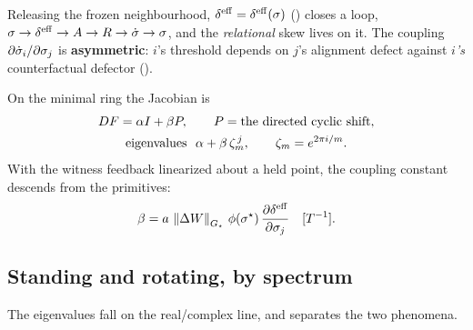 \documentclass[../main]{subfiles}
\begin{document}
Releasing the frozen neighbourhood, $\effdensity=\effdensity(\leanbare)$ ()
closes a loop, $\leanbare\to\effdensity\to\accountability\to\rewardfield\to\alignrate\to\leanbare$,
and the \emph{relational} skew lives on it. The coupling
$\partial\dot{\sigma}\sb{i}/\partial\sigma\sb{ j }$ is \textbf{asymmetric}: $i$'s threshold depends on
$j$'s alignment defect against \emph{$i$'s} counterfactual defector ().

\begin{definition}%
  On the minimal ring the Jacobian is
  \begin{equation}
    \begin{gathered}
      DF=\jacgrowth I+\jaccouple\cyclicshift,\qquad
        \cyclicshift=\text{the directed cyclic shift},\\
      \text{eigenvalues}\ \ \jacgrowth+\jaccouple\,\rootofunity_m^{\,j},\qquad
        \rootofunity_m=e^{2\pi i/m}.
    \end{gathered}
    \label{eq:dyn:jac}
  \end{equation}
  With the witness feedback linearized about a held point, the coupling constant
  descends from the primitives:
  \begin{equation}
    \jaccouple=\hingeA\,\normG{\surplus}\,\bendfn(\alignfixed)\,
      \frac{\partial\effdensity}{\partial\alignpair{}{j}}
      \quad \dimrate.
    \label{eq:dyn:jaccouple}
  \end{equation}
\end{definition}

\subsection{Standing and rotating, by spectrum}
\label{subsec:osc:spectrum}
%
The eigenvalues fall on the real/complex line, and  separates the two phenomena.
\end{document}
